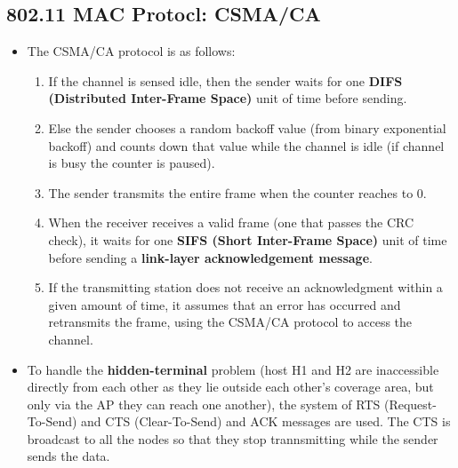\documentclass[a4paper]{article}
\theoremstyle{plain}
\theoremstyle{definition}
\begin{document}
\subsection{802.11 MAC Protocl: CSMA/CA}
\begin{itemize}
    \item The CSMA/CA protocol is as follows:
    \begin{enumerate}
        \item If the channel is sensed idle, then the sender waits for one \textbf{DIFS (Distributed Inter-Frame Space)} unit of time before sending. 
        
        \item Else the sender chooses a random backoff value (from binary exponential backoff) and counts down that value while the channel is idle (if channel is busy the counter is paused).
        
        \item The sender transmits the entire frame when the counter reaches to 0. 
        
        \item When the receiver receives a valid frame (one that passes the CRC check), it waits for one \textbf{SIFS (Short Inter-Frame Space)} unit of time before sending a \textbf{link-layer acknowledgement message}. 
        
        \item If the transmitting station does not receive an acknowledgment within a given amount of time, it assumes that an error has occurred and retransmits the frame, using the CSMA/CA protocol to access the channel.
    \end{enumerate}
    
    \item To handle the \textbf{hidden-terminal} problem (host H1 and H2 are inaccessible directly from each other as they lie outside each other's coverage area, but only via the AP they can reach one another), the system of RTS (Request-To-Send) and CTS (Clear-To-Send) and ACK messages are used. The CTS is broadcast to all the nodes so that they stop trannsmitting while the sender sends the data. 
\end{itemize}
\end{document}
